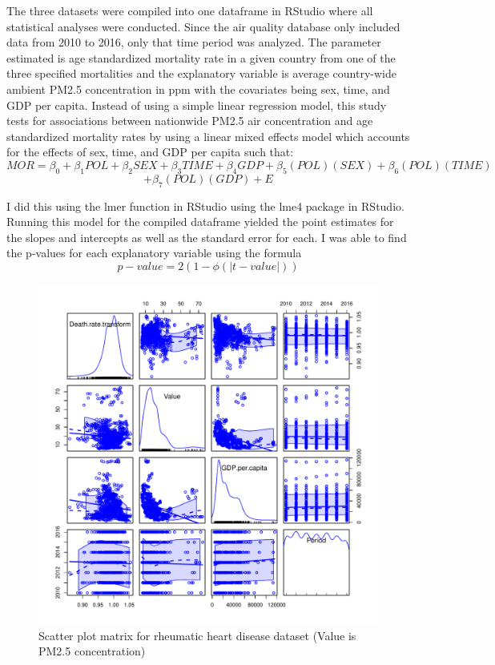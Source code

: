 \documentclass[12pt, letterpaper, twoside]{article}\usepackage[]{graphicx}\usepackage[]{xcolor}
\begin{document}
The three datasets were compiled into one dataframe in RStudio where all
statistical analyses were conducted. Since the air quality database only included
data from 2010 to 2016, only that time period was analyzed. The parameter estimated
is age standardized mortality rate in a given country from one of the three
specified mortalities and the explanatory variable is average country-wide
ambient PM2.5 concentration in ppm with the covariates being sex, time, and GDP
per capita. Instead of using a simple linear regression model, this study tests
for associations between nationwide PM2.5 air concentration and age standardized
mortality rates by using a linear mixed effects model which accounts for the
effects of sex, time, and GDP per capita such that:
\[
  MOR = \beta_{0} + \beta_{1}POL + \beta_{2}SEX + \beta_{3}TIME +\beta_{4}GDP
  + \beta_{5}(POL)(SEX) + \beta_{6}(POL)(TIME)
\]
\[
 + \beta_{7}(POL)(GDP) + E
\]

I did this using the lmer function in RStudio using the lme4 package in RStudio.
Running this model for the compiled dataframe yielded the point estimates for
the slopes and intercepts as well as the standard error for each. I was able to
find the p-values for each explanatory variable using the formula
\[
  p-value = 2(1 - \phi(|t-value|))
\]

\begin{figure}[t]
\includegraphics[scale=0.5]{scatterplotmatrix.rheum.pdf}
\centering
\caption{Scatter plot matrix for rheumatic heart disease dataset (Value is PM2.5 concentration)}
\label{fig:Figure 3}
    \vspace{1cm}
\end{figure}
\end{document}
